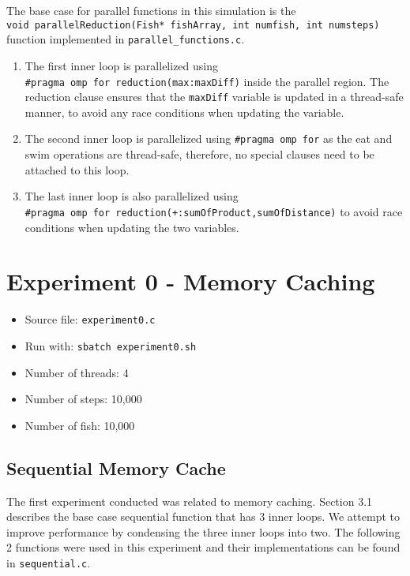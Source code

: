 \documentclass[
]{article}
\providecommand{\tightlist}{%
  \setlength{\itemsep}{0pt}\setlength{\parskip}{0pt}}
\begin{document}
The base case for parallel functions in this simulation is the
\texttt{void\ parallelReduction(Fish*\ fishArray,\ int\ numfish,\ int\ numsteps)}
function implemented in \texttt{parallel\_functions.c}.

\begin{enumerate}
\def\labelenumi{\arabic{enumi}.}
\item
  The first inner loop is parallelized using
  \texttt{\#pragma\ omp\ for\ reduction(max:maxDiff)} inside the
  parallel region. The reduction clause ensures that the
  \texttt{maxDiff} variable is updated in a thread-safe manner, to avoid
  any race conditions when updating the variable.
\item
  The second inner loop is parallelized using
  \texttt{\#pragma\ omp\ for} as the eat and swim operations are
  thread-safe, therefore, no special clauses need to be attached to this
  loop.
\item
  The last inner loop is also parallelized using
  \texttt{\#pragma\ omp\ for\ reduction(+:sumOfProduct,sumOfDistance)}
  to avoid race conditions when updating the two variables.
\end{enumerate}

\hypertarget{experiment-0---memory-caching}{%
\section{Experiment 0 - Memory
Caching}\label{experiment-0---memory-caching}}

\begin{itemize}
\tightlist
\item
  Source file: \texttt{experiment0.c}
\item
  Run with: \texttt{sbatch\ experiment0.sh}
\item
  Number of threads: 4
\item
  Number of steps: 10,000
\item
  Number of fish: 10,000
\end{itemize}

\hypertarget{sequential-memory-cache}{%
\subsection{Sequential Memory Cache}\label{sequential-memory-cache}}

The first experiment conducted was related to memory caching. Section
3.1 describes the base case sequential function that has 3 inner loops.
We attempt to improve performance by condensing the three inner loops
into two. The following 2 functions were used in this experiment and
their implementations can be found in \texttt{sequential.c}.
\end{document}
